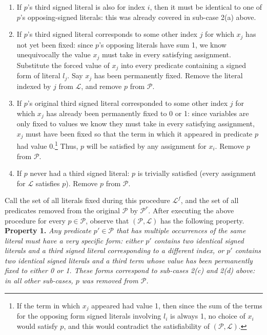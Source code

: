 \documentclass{article}
\begin{document}
\begin{enumerate}
\begin{enumerate}
\item If $p$'s third signed literal is also for index $i$, then it must be identical to one of $p$'s opposing-signed literals: this was already covered in sub-case 2(a) above.
\item  If $p$'s third signed literal corresponds to some other index $j$ for which $x_j$ has not yet been fixed: since $p$'s opposing literals have sum 1, we know unequivocally the value $x_j$ must take in every satisfying assignment. Substitute the forced value of $x_j$ into every predicate containing a signed form of literal $l_j$. Say $x_j$ has been permanently fixed. 
 Remove the literal indexed by $j$ from $\mathcal{L}$, and remove $p$ from $\mathcal{P}$. 
\item If $p$'s original third signed literal corresponded to some other index $j$ for which $x_j$ has already been permanently fixed to 0 or 1: since variables are only fixed to values we know they must take in every satisfying assignment, $x_j$ must have been fixed so that the term in which it appeared in predicate $p$ had value 0.\footnote{If the term in which $x_j$ appeared had value 1, then since the sum of the terms for the opposing form signed literals involving $l_i$ is always 1, no choice of $x_i$ would satisfy $p$, and this would contradict the satisfiability of $(\mathcal{P}, \mathcal{L})$. } Thus, $p$ will be satisfied by any assignment for $x_i$. Remove $p$ from $\mathcal{P}$.

\item If $p$ never had a third signed literal:  $p$ is trivially satisfied (every assignment for $\mathcal{L}$ satisfies $p$). Remove $p$ from $\mathcal{P}$.


\end{enumerate}
\end{enumerate}

Call the set of all literals fixed during this procedure $\mathcal{L}^f$, and the set of all predicates removed from the original $\mathcal{P}$ by $\mathcal{P}^r$.
After executing the above procedure for every $p\in \mathcal{P}$, observe that $(\mathcal{P}, \mathcal{L})$ has the following property.  \\

\noindent \textbf{Property 1.} \textit{Any predicate $p'\in \mathcal{P}$ that has multiple occurrences of the same literal must have a very specific form: either $p'$ contains two identical signed literals and a third signed literal corresponding to a different index, or  $p'$ contains two identical signed literals and a third term whose value has been permanently fixed to either 0 or 1. These forms correspond to sub-cases 2(c) and 2(d) above: in all other sub-cases, $p$ was removed from $\mathcal{P}$.}\\
\end{document}
